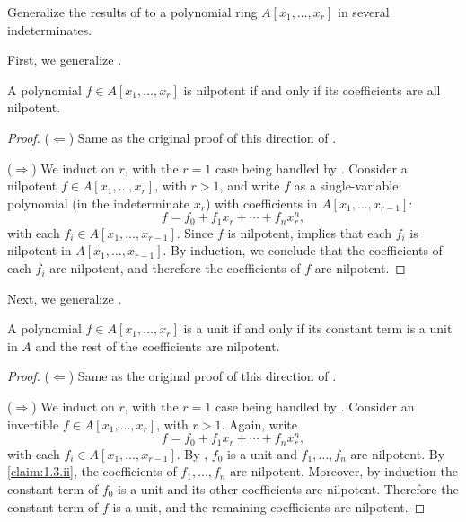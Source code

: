 \begin{exercise}
Generalize the results of  to a polynomial ring \(A[x_1,\ldots,x_r]\) in several indeterminates.
\end{exercise}

\begin{solution}
First, we generalize .

\begin{claim}
\label{claim:1.3.ii}
A polynomial \(f\in A[x_1,\ldots,x_r]\) is nilpotent if and only if its coefficients are all nilpotent.
\end{claim}

\begin{proof}
(\(\Leftarrow\))
Same as the original proof of this direction of .

(\(\Rightarrow\))
We induct on \(r\), with the \(r=1\) case being handled by .
Consider a nilpotent \(f \in A[x_1,\ldots,x_r]\), with \(r > 1\), and write \(f\) as a single-variable polynomial (in the indeterminate \(x_r\)) with coefficients in \(A[x_1,\ldots,x_{r-1}]\):
\begin{equation*}
f = f_0 + f_1 x_r + \cdots + f_n x_r^n,
\end{equation*}
with each \(f_i \in A[x_1,\ldots,x_{r-1}]\).
Since \(f\) is nilpotent,  implies that each \(f_i\) is nilpotent in \(A[x_1,\ldots,x_{r-1}]\).
By induction, we conclude that the coefficients of each \(f_i\) are nilpotent, and therefore the coefficients of \(f\) are nilpotent.
\end{proof}

Next, we generalize .

\begin{claim}
\label{claim:1.3.i}
A polynomial \(f \in A[x_1, \ldots, x_r]\) is a unit if and only if its constant term is a unit in \(A\) and the rest of the coefficients are nilpotent.
\end{claim}

\begin{proof}
(\(\Leftarrow\))
Same as the original proof of this direction of .

(\(\Rightarrow\))
We induct on \(r\), with the \(r = 1\) case being handled by .
Consider an invertible \(f \in A[x_1, \ldots, x_r]\), with \(r > 1\).
Again, write
\begin{equation*}
f = f_0 + f_1 x_r + \cdots + f_n x_r^n,
\end{equation*}
with each \(f_i \in A[x_1, \ldots, x_{r-1}]\).
By , \(f_0\) is a unit and \(f_1, \ldots, f_n\) are nilpotent.
By \autoref{claim:1.3.ii}, the coefficients of \(f_1, \ldots, f_n\) are nilpotent.
Moreover, by induction the constant term of \(f_0\) is a unit and its other coefficients are nilpotent.
Therefore the constant term of \(f\) is a unit, and the remaining coefficients are nilpotent.
\end{proof}


\end{solution}

